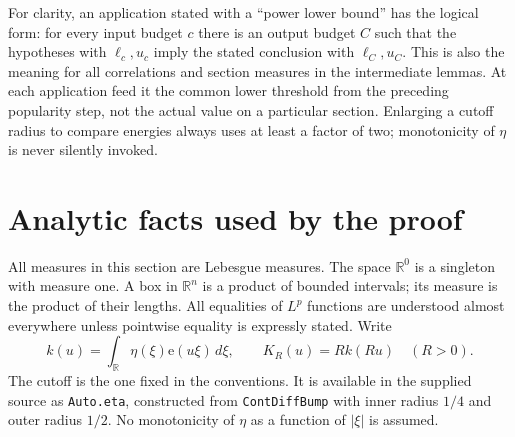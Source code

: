 \documentclass[11pt]{article}
\theoremstyle{definition}
\newcommand{\ee}[1]{\mathrm e\!\left(#1\right)}
\newcommand{\pid}[1]{\nolinkurl{#1}}
\newcommand{\R}{\mathbb R}
\begin{document}
For clarity, an application stated with a ``power lower bound'' has the logical form:
for every input budget $c$ there is an output budget $C$ such that the hypotheses with
$\ell_c,u_c$ imply the stated conclusion with $\ell_C,u_C$. This is also the meaning for
all correlations and section measures in the intermediate lemmas. At each application
feed it the common lower threshold from the preceding popularity step, not the actual
value on a particular section. Enlarging a cutoff radius to compare energies always uses
at least a factor of two; monotonicity of $\eta$ is never silently invoked.


\section{Analytic facts used by the proof}\label{sec:analytic-foundations}
All measures in this section are Lebesgue measures. The space $\R^0$ is a singleton with
measure one. A box in $\R^n$ is a product of bounded intervals; its measure is the product
of their lengths. All equalities of $L^p$ functions are understood almost everywhere unless
pointwise equality is expressly stated. Write
\[
 k(u)=\int_{\R}\eta(\xi)\ee{u\xi}\,d\xi,
 \qquad K_R(u)=Rk(Ru)\quad(R>0).
\]
The cutoff is the one fixed in the conventions. It is available in the supplied source as
\pid{Auto.eta}, constructed from \pid{ContDiffBump} with inner radius $1/4$ and outer radius $1/2$.
No monotonicity of $\eta$ as a function of $|\xi|$ is assumed.
\end{document}
